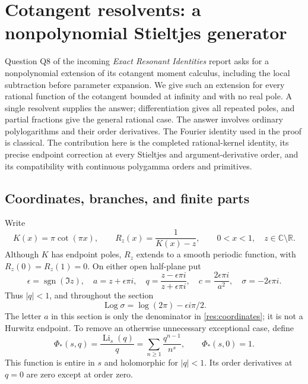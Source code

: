 \documentclass[11pt,a4paper]{article}
\numberwithin{equation}{section}
\theoremstyle{definition}
\theoremstyle{remark}
\DeclareMathOperator{\Li}{Li}
\DeclareMathOperator{\Log}{Log}
\begin{document}


\section{Cotangent resolvents: a nonpolynomial Stieltjes generator}
\label{res:section}

Question Q8 of the incoming \emph{Exact Resonant Identities} report
\cite{ghp:ExactResonant} asks for a nonpolynomial extension of its
cotangent moment calculus, including the local subtraction before
parameter expansion. We give such an extension for every rational
function of the cotangent bounded at infinity and with no real pole. A single
resolvent supplies the answer; differentiation gives all repeated
poles, and partial fractions give the general rational case. The
answer involves ordinary polylogarithms and their order derivatives.
The Fourier identity used in the proof is classical. The contribution
here is the completed rational-kernel identity, its precise endpoint
correction at every Stieltjes and argument-derivative order, and its
compatibility with continuous polygamma orders and primitives.

\subsection{Coordinates, branches, and finite parts}

Write
\begin{equation}\label{res:kernel}
 K(x)=\pi\cot(\pi x),\qquad
 R_z(x)=\frac1{K(x)-z},\qquad 0<x<1,\quad z\in\mathbb C\setminus\mathbb R.
\end{equation}
Although $K$ has endpoint poles, $R_z$ extends to a smooth periodic
function, with $R_z(0)=R_z(1)=0$. On either open half-plane put
\begin{equation}\label{res:coordinates}
 \epsilon=\operatorname{sgn}(\Im z),\quad
 a=z+\epsilon\pi i,\quad
 q=\frac{z-\epsilon\pi i}{z+\epsilon\pi i},\quad
 c=\frac{2\epsilon\pi i}{a^2},\quad
 \sigma=-2\epsilon\pi i.
\end{equation}
Thus $|q|<1$, and throughout the section
\[
 \Log\sigma=\log(2\pi)-\epsilon i\pi/2.
\]
The letter $a$ in this section is only the denominator in
\eqref{res:coordinates}; it is not a Hurwitz endpoint.
To remove an otherwise unnecessary exceptional case, define
\begin{equation}\label{res:normalizedpolylog}
 \Phi_*(s,q)=\frac{\Li_s(q)}q
       =\sum_{n\ge1}\frac{q^{n-1}}{n^s},\qquad
 \Phi_*(s,0)=1.
\end{equation}
This function is entire in $s$ and holomorphic for $|q|<1$.
Its order derivatives at $q=0$ are zero except at order zero.
\end{document}
